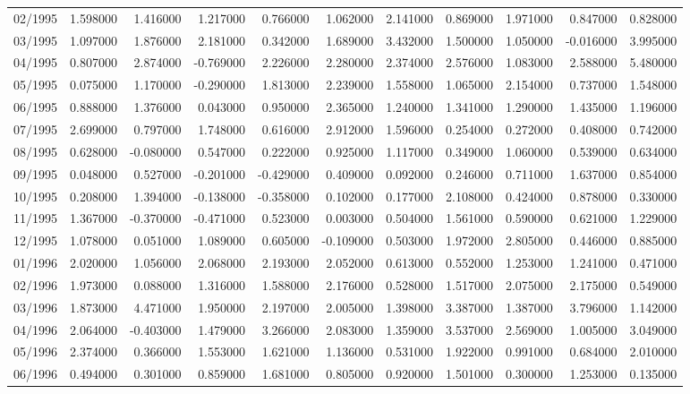 \begin{tabular}{lrrrrrrrrrr}
02/1995 & 1.598000 & 1.416000 & 1.217000 & 0.766000 & 1.062000 & 2.141000 & 0.869000 & 1.971000 & 0.847000 & 0.828000 \\
03/1995 & 1.097000 & 1.876000 & 2.181000 & 0.342000 & 1.689000 & 3.432000 & 1.500000 & 1.050000 & -0.016000 & 3.995000 \\
04/1995 & 0.807000 & 2.874000 & -0.769000 & 2.226000 & 2.280000 & 2.374000 & 2.576000 & 1.083000 & 2.588000 & 5.480000 \\
05/1995 & 0.075000 & 1.170000 & -0.290000 & 1.813000 & 2.239000 & 1.558000 & 1.065000 & 2.154000 & 0.737000 & 1.548000 \\
06/1995 & 0.888000 & 1.376000 & 0.043000 & 0.950000 & 2.365000 & 1.240000 & 1.341000 & 1.290000 & 1.435000 & 1.196000 \\
07/1995 & 2.699000 & 0.797000 & 1.748000 & 0.616000 & 2.912000 & 1.596000 & 0.254000 & 0.272000 & 0.408000 & 0.742000 \\
08/1995 & 0.628000 & -0.080000 & 0.547000 & 0.222000 & 0.925000 & 1.117000 & 0.349000 & 1.060000 & 0.539000 & 0.634000 \\
09/1995 & 0.048000 & 0.527000 & -0.201000 & -0.429000 & 0.409000 & 0.092000 & 0.246000 & 0.711000 & 1.637000 & 0.854000 \\
10/1995 & 0.208000 & 1.394000 & -0.138000 & -0.358000 & 0.102000 & 0.177000 & 2.108000 & 0.424000 & 0.878000 & 0.330000 \\
11/1995 & 1.367000 & -0.370000 & -0.471000 & 0.523000 & 0.003000 & 0.504000 & 1.561000 & 0.590000 & 0.621000 & 1.229000 \\
12/1995 & 1.078000 & 0.051000 & 1.089000 & 0.605000 & -0.109000 & 0.503000 & 1.972000 & 2.805000 & 0.446000 & 0.885000 \\
01/1996 & 2.020000 & 1.056000 & 2.068000 & 2.193000 & 2.052000 & 0.613000 & 0.552000 & 1.253000 & 1.241000 & 0.471000 \\
02/1996 & 1.973000 & 0.088000 & 1.316000 & 1.588000 & 2.176000 & 0.528000 & 1.517000 & 2.075000 & 2.175000 & 0.549000 \\
03/1996 & 1.873000 & 4.471000 & 1.950000 & 2.197000 & 2.005000 & 1.398000 & 3.387000 & 1.387000 & 3.796000 & 1.142000 \\
04/1996 & 2.064000 & -0.403000 & 1.479000 & 3.266000 & 2.083000 & 1.359000 & 3.537000 & 2.569000 & 1.005000 & 3.049000 \\
05/1996 & 2.374000 & 0.366000 & 1.553000 & 1.621000 & 1.136000 & 0.531000 & 1.922000 & 0.991000 & 0.684000 & 2.010000 \\
06/1996 & 0.494000 & 0.301000 & 0.859000 & 1.681000 & 0.805000 & 0.920000 & 1.501000 & 0.300000 & 1.253000 & 0.135000 \\

\end{tabular}
